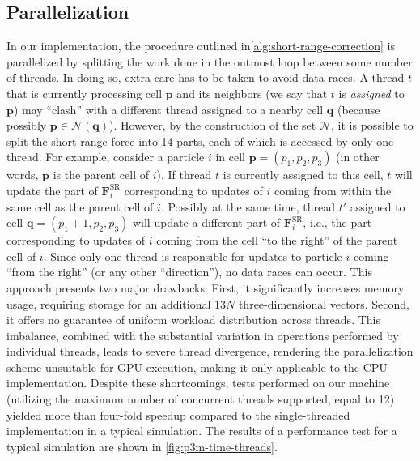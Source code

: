 \subsection{Parallelization}
In our implementation, the procedure outlined in\autoref{alg:short-range-correction} is parallelized by splitting the work done in the outmost loop between some number of threads.
In doing so, extra care has to be taken to avoid data races.
A thread $t$ that is currently processing cell $\mathbf{p}$ and its neighbors (we say that $t$ is \textit{assigned} to $\mathbf{p}$) may ``clash'' with a different thread assigned to a nearby cell $\mathbf{q}$ (because possibly $\mathbf{p} \in \mathcal{N}(\mathbf{q})$).
However, by the construction of the set $\mathcal{N}$, it is possible to split the short-range force into 14 parts, each of which is accessed by only one thread.
For example, consider a particle $i$ in cell $\mathbf{p} = (p_1, p_2, p_3)$ (in other words, $\mathbf{p}$ is the parent cell of $i$).
If thread $t$ is currently assigned to this cell, $t$ will update the part of $\mathbf{F}^\text{SR}_i$ corresponding to updates of $i$ coming from within the same cell as the parent cell of $i$.
Possibly at the same time, thread $t'$ assigned to cell $\mathbf{q} = (p_1+1, p_2, p_3)$ will update a different part of $\mathbf{F}^\text{SR}_i$, i.e., the part corresponding to updates of $i$ coming from the cell ``to the right'' of the parent cell of $i$.
Since only one thread is responsible for updates to particle $i$ coming ``from the right'' (or any other ``direction''), no data races can occur.
This approach presents two major drawbacks.
First, it significantly increases memory usage, requiring storage for an additional $13N$ three-dimensional vectors.
Second, it offers no guarantee of uniform workload distribution across threads.
This imbalance, combined with the substantial variation in operations performed by individual threads, leads to severe thread divergence, rendering the parallelization scheme unsuitable for GPU execution, making it only applicable to the CPU implementation.
Despite these shortcomings, tests performed on our machine (utilizing the maximum number of concurrent threads supported, equal to 12) yielded more than four-fold speedup compared to the single-threaded implementation in a typical simulation.
The results of a performance test for a typical simulation are shown in \autoref{fig:p3m-time-threads}.
